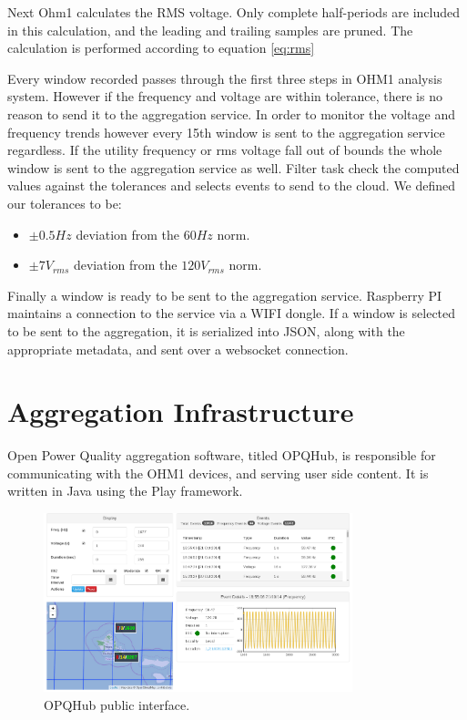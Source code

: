 Next Ohm1 calculates the RMS voltage. Only complete half-periods are included in this calculation, and the leading and trailing samples are pruned. The calculation is performed according to equation
\ref{eq:rms}

Every window recorded passes through the first three steps in OHM1 analysis system. However if the frequency and voltage are within tolerance, there is no reason to send it to the aggregation service.
In order to monitor the voltage and frequency trends however every 15th window is sent to the aggregation service regardless. If the utility frequency or rms voltage fall out of bounds the whole window is 
sent to the aggregation service as well. Filter task check the computed values against the tolerances and selects events to send to the cloud. We defined our tolerances to be:
\begin{itemize}
\item $\pm 0.5Hz$ deviation from the $60Hz$ norm.
\item $\pm 7V_{rms}$ deviation from the $120V_{rms}$ norm.
\end{itemize}

Finally a window is ready to be sent to the aggregation service. Raspberry PI maintains a connection to the service via a WIFI dongle. If a window is selected to be sent to the aggregation, it is
serialized into JSON, along with the appropriate metadata, and sent over a websocket connection.

\section{Aggregation Infrastructure}
Open Power Quality aggregation software, titled OPQHub, is responsible for communicating with the OHM1 devices, and serving user side content. It is written in Java using the Play framework. 
\begin{figure}[h!]
\label{fig:opqhub}
\centering
\includegraphics[width=0.8\textwidth]{img/opqhub.png}
\caption{OPQHub public interface.}
\end{figure}

